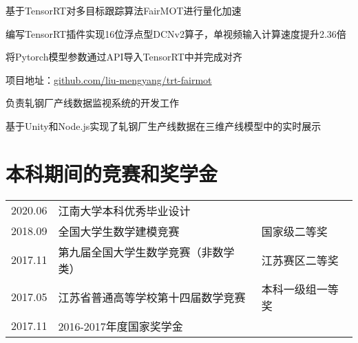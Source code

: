 \documentclass[]{deedy-resume-openfont}
\begin{document}
\begin{minipage}[t]{0.77\textwidth}
	\begin{tightemize}
		\item 基于TensorRT对多目标跟踪算法FairMOT进行量化加速
		\item 编写TensorRT插件实现16位浮点型DCNv2算子，单视频输入计算速度提升2.36倍
		\item 将Pytorch模型参数通过API导入TensorRT中并完成对齐
		\item 项目地址：\href{https://github.com/liu-mengyang/trt-fairmot}{github.com/liu-mengyang/trt-fairmot}
	\end{tightemize}
	\sectionsep

	\begin{tightemize}
		\item 负责轧钢厂产线数据监视系统的开发工作
		\item 基于Unity和Node.js实现了轧钢厂生产线数据在三维产线模型中的实时展示
	\end{tightemize}
	\sectionsep


	\section{本科期间的竞赛和奖学金}
    \begin{tabular}{lll}
		2020.06 & 江南大学本科优秀毕业设计 & \\
        2018.09 & 全国大学生数学建模竞赛 & 国家级二等奖 \\
        2017.11 & 第九届全国大学生数学竞赛（非数学类） & 江苏赛区二等奖 \\
        2017.05 & 江苏省普通高等学校第十四届数学竞赛 & 本科一级组一等奖\\
        2017.11 & 2016-2017年度国家奖学金 & \\
	\end{tabular}
    \sectionsep
\end{minipage}
\end{document}
